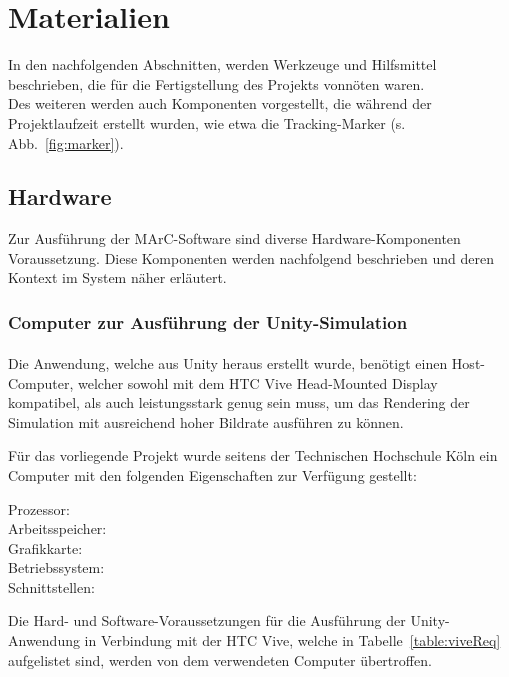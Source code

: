 \section{Materialien}
In den nachfolgenden Abschnitten, werden Werkzeuge und Hilfsmittel beschrieben, die für die Fertigstellung des Projekts vonnöten waren.\\ Des weiteren werden auch Komponenten vorgestellt, die während der Projektlaufzeit erstellt wurden, wie etwa die Tracking-Marker (s. Abb.~\ref{fig:marker}).

\subsection{Hardware}
Zur Ausführung der MArC-Software sind diverse Hardware-Komponenten Voraussetzung. Diese Komponenten werden nachfolgend beschrieben und deren Kontext im System näher erläutert.
\subsubsection{Computer zur Ausführung der Unity-Simulation}
Die Anwendung, welche aus Unity\textsuperscript{\cite{website:Unity}} heraus erstellt wurde, benötigt einen Host-Computer, welcher sowohl mit dem HTC Vive Head-Mounted Display kompatibel, als auch leistungsstark genug sein muss, um das Rendering der Simulation mit ausreichend hoher Bildrate ausführen zu können.

Für das vorliegende Projekt wurde seitens der Technischen Hochschule Köln ein Computer mit den folgenden Eigenschaften zur Verfügung gestellt:
\begin{description}
	\item[Prozessor:]
	\item[Arbeitsspeicher:]
	\item[Grafikkarte:]
	\item[Betriebssystem:]
	\item[Schnittstellen:]
\end{description}
Die Hard- und Software-Voraussetzungen für die Ausführung der Unity-Anwendung in Verbindung mit der HTC Vive, welche in Tabelle~\ref{table:viveReq} aufgelistet sind, werden von dem verwendeten Computer übertroffen.

